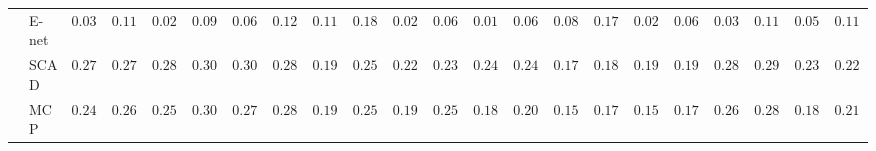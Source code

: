 \begin{tabular}{p{0.2cm}p{1cm}|p{0.6cm}p{0.6cm}|p{0.6cm}p{0.6cm}p{0.6cm}p{0.6cm}p{0.6cm}p{0.6cm}|p{0.6cm}p{0.6cm}p{0.6cm}p{0.6cm}p{0.6cm}p{0.6cm}|p{0.6cm}p{0.6cm}p{0.6cm}p{0.6cm}p{0.6cm}p{0.6cm}}
 & E-net  & $0.0300$ & $0.1193$ & $0.0233$ & $0.0948$ & $0.0650$ & $0.1273$ & $0.1167$ & $0.1812$ & $0.0217$ & $0.0655$ & $0.0183$ & $0.0666$ & $0.0850$ & $0.1700$ & $0.0217$ & $0.0611$ & $0.0367$ & $0.1150$ & $0.0517$ & $0.1129$ \\
 & SCAD  & $0.2767$ & $0.2755$ & $0.2850$ & $0.3027$ & $0.3083$ & $0.2827$ & $0.1967$ & $0.2522$ & $0.2283$ & $0.2341$ & $0.2483$ & $0.2433$ & $0.1717$ & $0.1887$ & $0.1900$ & $0.1939$ & $0.2833$ & $0.2935$ & $0.2333$ & $0.2235$ \\
 & MCP  & $0.2417$ & $0.2684$ & $0.2533$ & $0.3057$ & $0.2767$ & $0.2894$ & $0.1933$ & $0.2548$ & $0.1967$ & $0.2500$ & $0.1800$ & $0.2006$ & $0.1500$ & $0.1796$ & $0.1550$ & $0.1761$ & $0.2600$ & $0.2826$ & $0.1850$ & $0.2144$ \\
\hline 
\end{tabular}

